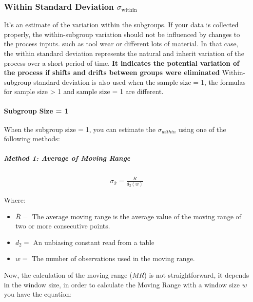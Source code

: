 \documentclass[11pt]{article}
\begin{document}
\hypertarget{within-standard-deviation-sigma_within}{%
\subsubsection{Within Standard Deviation \texorpdfstring{$\sigma_{\mathrm{within}}$}{sigma within}}\label{within-standard-deviation-sigma_within}}


It's an estimate of the variation within the subgroups. If your data is
collected properly, the within-subgroup variation should not be
influenced by changes to the process inputs. such as tool wear or
different lots of material. In that case, the within standard deviation
represents the natural and inherit variation of the process over a short
period of time. \textbf{It indicates the potential variation of the
process if shifts and drifts between groups were eliminated}
Within-subgroup standard deviation is also used when the sample size =
1, the formulas for sample size \textgreater{} 1 and sample size = 1 are
different.

\hypertarget{subgroup-size-1}{%
\paragraph{Subgroup Size = 1}\label{subgroup-size-1}}

When the subgroup size = 1, you can estimate the \(\sigma_{within}\)
using one of the following methods:

\hypertarget{average-moving-range}{%
\subparagraph{Method 1: Average of Moving Range}\label{average-moving-range}}

\begin{gather}
  \sigma_{\bar x} = \frac{\bar R}{d_2(w)}  
\end{gather}

Where: 
\begin{itemize}
  \item \(\bar R =\) The average moving range is the average value of the
  moving range of two or more consecutive points.
  \item \(d_2 =\) An unbiasing constant read from a table 
  \item \(w =\) The number of observations used in the moving range.
\end{itemize}

Now, the calculation of the moving range (\(MR\)) is not straightforward, it depends
in the window size, in order to calculate the Moving Range with 
a window size \(w\) you have the equation:
\end{document}
